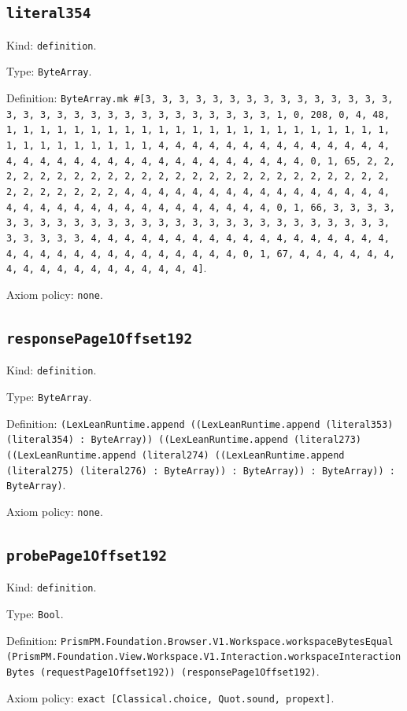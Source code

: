 \documentclass[11pt]{article}
\begin{document}
\subsection*{\texttt{literal354}}
\noindent Kind: \texttt{definition}.\par
\noindent Type: \texttt{ByteArray}.\par
\noindent Definition: \texttt{ByteArray.mk \#[3, 3, 3, 3, 3, 3, 3, 3, 3, 3, 3, 3, 3, 3, 3, 3, 3, 3, 3, 3, 3, 3, 3, 3, 3, 3, 3, 3, 3, 3, 3, 1, 0, 208, 0, 4, 48, 1, 1, 1, 1, 1, 1, 1, 1, 1, 1, 1, 1, 1, 1, 1, 1, 1, 1, 1, 1, 1, 1, 1, 1, 1, 1, 1, 1, 1, 1, 1, 1, 4, 4, 4, 4, 4, 4, 4, 4, 4, 4, 4, 4, 4, 4, 4, 4, 4, 4, 4, 4, 4, 4, 4, 4, 4, 4, 4, 4, 4, 4, 4, 4, 0, 1, 65, 2, 2, 2, 2, 2, 2, 2, 2, 2, 2, 2, 2, 2, 2, 2, 2, 2, 2, 2, 2, 2, 2, 2, 2, 2, 2, 2, 2, 2, 2, 2, 2, 4, 4, 4, 4, 4, 4, 4, 4, 4, 4, 4, 4, 4, 4, 4, 4, 4, 4, 4, 4, 4, 4, 4, 4, 4, 4, 4, 4, 4, 4, 4, 4, 0, 1, 66, 3, 3, 3, 3, 3, 3, 3, 3, 3, 3, 3, 3, 3, 3, 3, 3, 3, 3, 3, 3, 3, 3, 3, 3, 3, 3, 3, 3, 3, 3, 3, 3, 4, 4, 4, 4, 4, 4, 4, 4, 4, 4, 4, 4, 4, 4, 4, 4, 4, 4, 4, 4, 4, 4, 4, 4, 4, 4, 4, 4, 4, 4, 4, 4, 0, 1, 67, 4, 4, 4, 4, 4, 4, 4, 4, 4, 4, 4, 4, 4, 4, 4, 4, 4, 4]}.\par
\noindent Axiom policy: \texttt{none}.\par
\subsection*{\texttt{responsePage1Offset192}}
\noindent Kind: \texttt{definition}.\par
\noindent Type: \texttt{ByteArray}.\par
\noindent Definition: \texttt{(LexLeanRuntime.append ((LexLeanRuntime.append (literal353) (literal354) : ByteArray)) ((LexLeanRuntime.append (literal273) ((LexLeanRuntime.append (literal274) ((LexLeanRuntime.append (literal275) (literal276) : ByteArray)) : ByteArray)) : ByteArray)) : ByteArray)}.\par
\noindent Axiom policy: \texttt{none}.\par
\subsection*{\texttt{probePage1Offset192}}
\noindent Kind: \texttt{definition}.\par
\noindent Type: \texttt{Bool}.\par
\noindent Definition: \texttt{PrismPM.Foundation.Browser.V1.Workspace.workspaceBytesEqual (PrismPM.Foundation.View.Workspace.V1.Interaction.workspaceInteractionBytes (requestPage1Offset192)) (responsePage1Offset192)}.\par
\noindent Axiom policy: \texttt{exact [Classical.choice, Quot.sound, propext]}.\par
\end{document}
